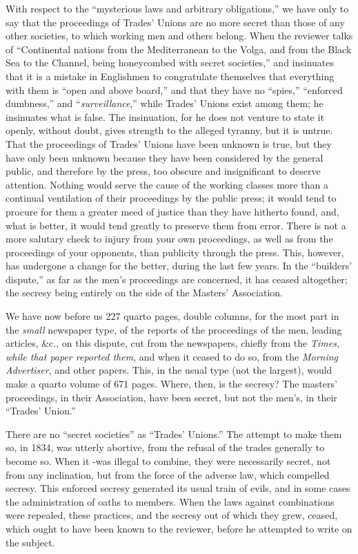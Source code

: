 With respect to the ``mysterious laws and arbitrary obligations,'' we
have only to say that the proceedings of Trades' Unions are no more
secret than those of any other societies, to which working men and
others belong. When the reviewer talks of ``Continental nations from the
Mediterranean to the Volga, and from the Black Sea to the Channel, being
honeycombed with secret societies,'' and insinuates that it is a mistake
in Englishmen to congratulate themselves that everything with them is
``open and above board,'' and that they have no ``spies,'' ``enforced
dumbness,'' and ``\textit{surveillance},'' while Trades' Unions exist
among them; he insinuates what is false. The insinuation, for he does
not venture to state it openly, without doubt, gives strength to the
alleged tyranny, but it is untrue. That the proceedings of Trades'
Unions have been unknown is true, but they have only been unknown
because they have been considered by the general public, and therefore
by the press, too obscure and insignificant to deserve attention.
Nothing would serve the cause of the working classes more than a
continual ventilation of their proceedings by the public press; it
would tend to procure for them a greater meed of justice than they have
hitherto found, and, what is better, it would tend greatly to preserve
them from error. There is not a more salutary check to injury from your
own proceedings, as well as from the proceedings of your opponents, than
publicity through the press. This, however, has undergone a change for
the better, during the last few years. In the ``builders' dispute,'' as
far as the men's proceedings are concerned, it has ceased altogether;
the secresy being entirely on the side of the Masters' Association.

We have now before us 227 quarto pages, double columns, for the most
part in the \textit{small} newspaper type, of the reports of the
proceedings of the men, leading articles, \&c., on this dispute, cut
from the newspapers, chiefly from the \textit{Times, while that paper
reported them}, and when it ceased to do so, from the \textit{Morning
Advertiser}, and other papers. This, in the usual type (not the largest),
would make a quarto volume of 671 pages. Where, then, is the secresy?
The masters' proceedings, in their Association, have been secret, but
not the men's, in their ``Trades' Union.''

There are no ``secret societies'' as ``Trades' Unions.'' The attempt to
make them so, in 1834, was utterly abortive, from the refusal of the
trades generally to become so. When it -was illegal to combine, they
were necessarily secret, not from any inclination, but from the force of
the adverse law, which compelled secresy. This enforced secresy
generated its usual train of evils, and in some cases the administration
of oaths to members. When the laws against combinations were repealed,
these practices, and the secresy out of which they grew, ceased, which
ought to have been known to the reviewer, before he attempted to write
on the subject.

